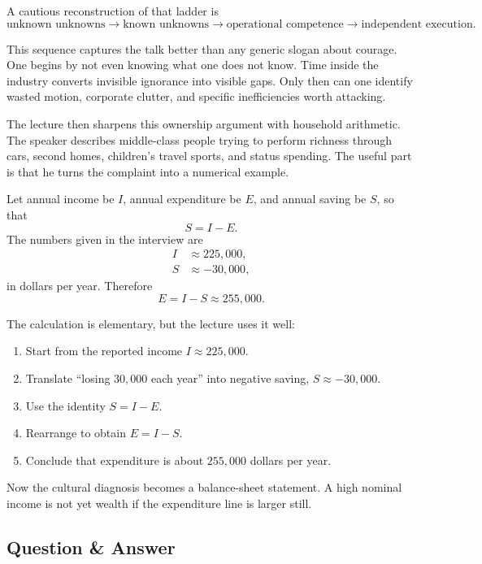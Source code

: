 A cautious reconstruction of that ladder is
\begin{equation}
\text{unknown unknowns} \to \text{known unknowns} \to \text{operational competence} \to \text{independent execution}.
\end{equation}

This sequence captures the talk better than any generic slogan about courage. One begins by not even knowing what one does not know. Time inside the industry converts invisible ignorance into visible gaps. Only then can one identify wasted motion, corporate clutter, and specific inefficiencies worth attacking.

The lecture then sharpens this ownership argument with household arithmetic. The speaker describes middle-class people trying to perform richness through cars, second homes, children's travel sports, and status spending. The useful part is that he turns the complaint into a numerical example.

Let annual income be \(I\), annual expenditure be \(E\), and annual saving be \(S\), so that
\begin{equation}
S = I - E.
\end{equation}
The numbers given in the interview are
\begin{align}
I &\approx 225{,}000,\\
S &\approx -30{,}000,
\end{align}
in dollars per year. Therefore
\begin{equation}
E = I - S \approx 255{,}000.
\end{equation}

The calculation is elementary, but the lecture uses it well:
\begin{enumerate}
\item Start from the reported income \(I\approx 225{,}000\).
\item Translate ``losing \(30{,}000\) each year'' into negative saving, \(S\approx -30{,}000\).
\item Use the identity \(S=I-E\).
\item Rearrange to obtain \(E=I-S\).
\item Conclude that expenditure is about \(255{,}000\) dollars per year.
\end{enumerate}

Now the cultural diagnosis becomes a balance-sheet statement. A high nominal income is not yet wealth if the expenditure line is larger still.

\subsection{Question \& Answer}

